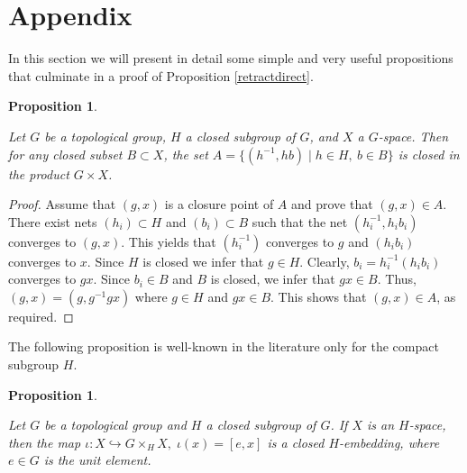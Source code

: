 \documentclass{amsart}
\newtheorem{proposition}[theorem]{Proposition}
\begin{document}
\medskip


\section{Appendix}\label{append}

In this section we will present in detail some simple and very useful propositions that culminate in a proof of Proposition \ref{retractdirect}.

 \begin{proposition}\label{closed}
 
Let $G$ be a topological group, $H$ a closed subgroup of $G$, and $X$ a $G$-space.
 Then for any closed subset $B\subset X$, the set $A=\{(h^{-1}, hb) \mid h\in H, \  b\in B\}$ is  closed in the product
$G\times X$.
 \end{proposition}

\begin{proof} 
Assume that  $(g, x)$ is a closure point of $A$ and prove that $(g, x)\in A$.   
 There exist nets  $(h_i)\subset H$ and  $(b_i)\subset B$   such that the net $(h_i^{-1}, h_ib_i)$ converges to $(g, x)$. 
This yields that 
$(h_i^{-1})$ converges to $g$ and  $(h_ib_i)$ converges to $x$. Since $H$ is closed we infer that $g\in H$. Clearly, $b_i=h_i^{-1}(h_ib_i)$ converges to $gx$. Since $b_i\in B$ and $B$ is closed, we infer that $gx\in B$. Thus, $(g, x)=(g, g^{-1}gx)$ where   $g\in H$ and $gx\in B$. This shows  that 
 $(g, x)\in A$, as required.

\end{proof}


The following proposition is well-known in the literature only for the compact subgroup $H$.

 \begin{proposition}\label{closed}
 
Let $G$ be a topological group and $H$ a closed subgroup of $G$. If $X$ is an $H$-space, then  the map $\iota:X \hookrightarrow G \times_H X, \; \iota(x) = [e,x]$ is a closed $H$-embedding, where $e\in G$ is the unit element.
 \end{proposition}
 
\end{document}
